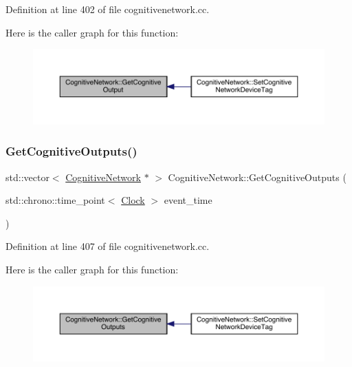 Definition at line 402 of file cognitivenetwork.\+cc.

Here is the caller graph for this function\+:
\nopagebreak
\begin{figure}[H]
\begin{center}
\leavevmode
\includegraphics[width=350pt]{class_cognitive_network_a947fa4c50fecc4008d2bcfc96a272ffc_icgraph}
\end{center}
\end{figure}
\mbox{\label{class_cognitive_network_acdf847165899c36d6d9d6843ecc27218}} 
\subsubsection{\texorpdfstring{Get\+Cognitive\+Outputs()}{GetCognitiveOutputs()}}
{\footnotesize\ttfamily std\+::vector$<$ \hyperlink{class_cognitive_network}{Cognitive\+Network} $\ast$ $>$ Cognitive\+Network\+::\+Get\+Cognitive\+Outputs (\begin{DoxyParamCaption}\item[{std\+::chrono\+::time\+\_\+point$<$ \hyperlink{universe_8h_a0ef8d951d1ca5ab3cfaf7ab4c7a6fd80}{Clock} $>$}]{event\+\_\+time }\end{DoxyParamCaption})}



Definition at line 407 of file cognitivenetwork.\+cc.

Here is the caller graph for this function\+:
\nopagebreak
\begin{figure}[H]
\begin{center}
\leavevmode
\includegraphics[width=350pt]{class_cognitive_network_acdf847165899c36d6d9d6843ecc27218_icgraph}
\end{center}
\end{figure}
\mbox{\label{class_cognitive_network_a160bb447671609eb14b1b8043639ac74}} 
